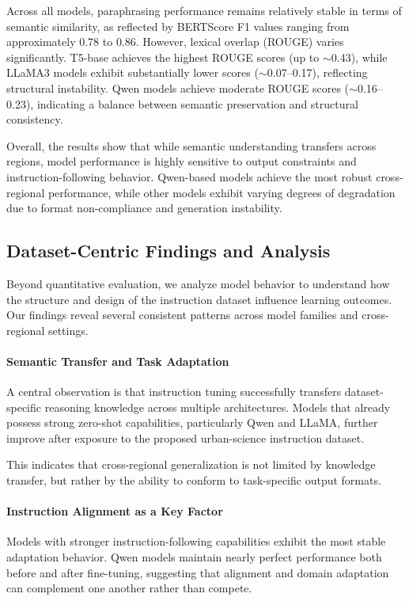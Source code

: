 \documentclass[a4paper,fleqn]{cas-sc}
\begin{document}
Across all models, paraphrasing performance remains relatively stable in terms of semantic similarity, as reflected by BERTScore F1 values ranging from approximately 0.78 to 0.86. However, lexical overlap (ROUGE) varies significantly. T5-base achieves the highest ROUGE scores (up to $\sim$0.43), while LLaMA3 models exhibit substantially lower scores ($\sim$0.07–0.17), reflecting structural instability. Qwen models achieve moderate ROUGE scores ($\sim$0.16–0.23), indicating a balance between semantic preservation and structural consistency.

Overall, the results show that while semantic understanding transfers across regions, model performance is highly sensitive to output constraints and instruction-following behavior. Qwen-based models achieve the most robust cross-regional performance, while other models exhibit varying degrees of degradation due to format non-compliance and generation instability.

\subsection{Dataset-Centric Findings and Analysis}

Beyond quantitative evaluation, we analyze model behavior to understand how the structure and design of the instruction dataset influence learning outcomes. Our findings reveal several consistent patterns across model families and cross-regional settings.

\paragraph{Semantic Transfer and Task Adaptation}

A central observation is that instruction tuning successfully transfers dataset-specific reasoning knowledge across multiple architectures. Models that already possess strong zero-shot capabilities, particularly Qwen and LLaMA, further improve after exposure to the proposed urban-science instruction dataset.

This indicates that cross-regional generalization is not limited by knowledge transfer, but rather by the ability to conform to task-specific output formats.

\paragraph{Instruction Alignment as a Key Factor}

Models with stronger instruction-following capabilities exhibit the most stable adaptation behavior. Qwen models maintain nearly perfect performance both before and after fine-tuning, suggesting that alignment and domain adaptation can complement one another rather than compete.
\end{document}
